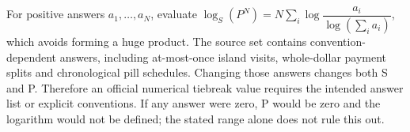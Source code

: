 For positive answers $a_1,\ldots,a_N$, evaluate $\log_S(P^N)=N\sum_i\log \dfrac{a_i}{\log(\sum_i a_i)}$, which avoids forming a huge product. The source set contains convention-dependent answers, including at-most-once island visits, whole-dollar payment splits and chronological pill schedules. Changing those answers changes both S and P. Therefore an official numerical tiebreak value requires the intended answer list or explicit conventions. If any answer were zero, P would be zero and the logarithm would not be defined; the stated range alone does not rule this out.
